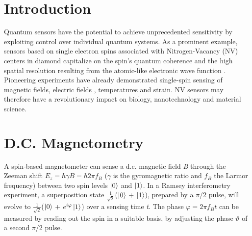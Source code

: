\clearpage

\section{Introduction}
Quantum sensors have the potential to achieve unprecedented sensitivity by exploiting control over individual quantum systems\cite{Giovannetti_NatPhoton_2011,Higgins_Nature_2007}. As a prominent example, sensors based on single electron spins associated with Nitrogen-Vacancy (NV) centers in diamond capitalize on the spin's quantum coherence and the high spatial resolution resulting from the atomic-like electronic wave function \cite{Degen_APL_2008,Taylor_NatPhys_2008}. Pioneering experiments have already demonstrated single-spin sensing of magnetic fields\cite{Maze_Nature_2008,Balasubramanian_Nature_2008,Balasubramanian_NatMater_2009}, electric fields \cite{Dolde_NatPhys_2011}, temperatures\cite{Acosta_Phys.Rev.Lett._2010,Toyli_PNAS_2013} and strain\cite{Ovartchaiyapong_NatCommun_2014}. NV sensors may therefore have a revolutionary impact on biology\cite{LeSage_Nature_2013,Kaufmann_PNAS_2013,Kucsko_Nature_2013,Shi_Science_2015}, nanotechnology\cite{Maletinsky_NatNano_2012,Staudacher_Science_2013,Mamin_Science_2013} and material science\cite{Tetienne_Science_2014,Kolkowitz_Science_2015}. 

\section{D.C. Magnetometry}
A spin-based magnetometer can sense a d.c. magnetic field \textit{B} through the Zeeman shift $E_z=\hbar \gamma B = \hbar 2 \pi f_B$ ($\gamma$ is the gyromagnetic ratio and $f_B$ the Larmor frequency) between two spin levels $\left|0\right>$ and $\left|1\right>$. In a Ramsey interferometry experiment, a superposition state  $\frac{1}{\sqrt{2}}$($\left|0\right>$ + $\left|1\right>$), prepared by a $\pi$/2 pulse, will evolve to $\frac{1}{\sqrt{2}}$($\left|0\right>$ + $e^{i\varphi}\left|1\right>$)   over a sensing time \textit{t}. The phase $\varphi = 2 \pi f_B t$ can be measured by reading out the spin in a suitable basis, by adjusting the phase $\vartheta$ of a second $\pi$/2 pulse.


